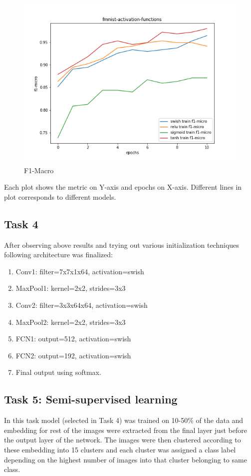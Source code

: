 \documentclass{article}
\begin{document}
\begin{figure}[!htb]
	\includegraphics[width=\linewidth]{../output_plots/FMNIST/task-3/fmnist-activation-functions-F1-Micro-score-f1-micro.png}
	\caption{F1-Macro}\label{fig:part_1_task_3_f1-macro}
	\endminipage
\end{figure}

Each plot shows the metric on Y-axis and epochs on X-axis. Different lines in plot corresponds to different models.

\pagebreak
\subsection{Task 4}
After observing above results and trying out various initialization techniques following architecture was finalized:
\begin{enumerate}
	\item Conv1: filter=7x7x1x64, activation=swish
	\item MaxPool1: kernel=2x2, strides=3x3
	\item Conv2: filter=3x3x64x64, activation=swish
	\item MaxPool2: kernel=2x2, strides=3x3
	\item FCN1: output=512, activation=swish
	\item FCN2: output=192, activation=swish
	\item Final output using softmax.
\end{enumerate}

\subsection{Task 5: Semi-supervised learning}
In this task model (selected in Task 4) was trained on 10-50\% of the data and embedding for rest of the images were extracted from the final layer just before the output layer of the network. The images were then clustered according to these embedding into 15 clusters and each cluster was assigned a class label depending on the highest number of images into that cluster belonging to same class.
\end{document}
